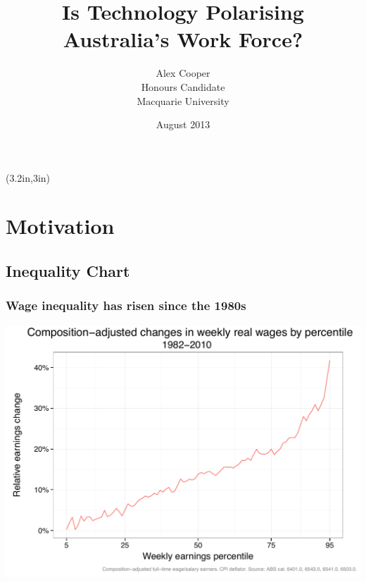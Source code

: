 \documentclass[red]{beamer}
\title[Tasks and Polarisation]{Is Technology Polarising Australia's Work Force?}
\author{Alex Cooper \\ Honours Candidate \\ Macquarie University}
\date{August 2013}
\begin{document}
%
\begin{frame}[plain]
\titlepage
\begin{textblock*}{\textwidth}(3.2in,3in) 
\end{textblock*} 
\end{frame}

\section{Motivation}

\subsection{Inequality Chart}
\begin{frame}[c]
\frametitle{Wage inequality has risen since the 1980s}
\begin{center}
  \includegraphics[width=\textwidth]{slides_fig/quantile_growth_percent.pdf}
\end{center}
\end{frame}
\end{document}
